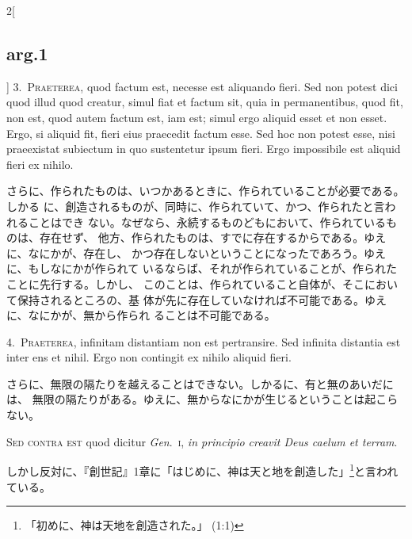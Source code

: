 \documentclass[paper=a4paper,fontsize=10pt,jafontsize=9pt,titlepage]{jlreq}
\begin{document}
\begin{paracol}{2}[\subsection{arg.1}]
3.~{\scshape Praeterea}, quod factum est, necesse est aliquando fieri. Sed non potest
 dici quod illud quod creatur, simul fiat et factum sit, quia in
 permanentibus, quod fit, non est, quod autem factum est, iam est; simul
 ergo aliquid esset et non esset. Ergo, si aliquid fit, fieri eius
 praecedit factum esse. Sed hoc non potest esse, nisi praeexistat
 subiectum in quo sustentetur ipsum fieri. Ergo impossibile est aliquid
 fieri ex nihilo.

\switchcolumn

さらに、作られたものは、いつかあるときに、作られていることが必要である。しかる
 に、創造されるものが、同時に、作られていて、かつ、作られたと言われることはでき
 ない。なぜなら、永続するものどもにおいて、作られているものは、存在せず、
他方、作られたものは、すでに存在するからである。ゆえに、なにかが、存在し、
 かつ存在しないということになったであろう。ゆえに、もしなにかが作られて
 いるならば、それが作られていることが、作られたことに先行する。しかし、
 このことは、作られていること自体が、そこにおいて保持されるところの、基
 体が先に存在していなければ不可能である。ゆえに、なにかが、無から作られ
 ることは不可能である。


4.~{\scshape Praeterea}, infinitam distantiam non est pertransire. Sed infinita
 distantia est inter ens et nihil. Ergo non contingit ex nihilo aliquid
 fieri.

\switchcolumn

さらに、無限の隔たりを越えることはできない。しかるに、有と無のあいだには、
 無限の隔たりがある。ゆえに、無からなにかが生じるということは起こらない。

\switchcolumn*[\subsection{s.c.}]

{\scshape Sed contra est} quod dicitur {\itshape Gen}.~{\scshape i}, {\itshape in principio creavit Deus caelum et
 terram}.

\switchcolumn

しかし反対に、『創世記』1章に「はじめに、神は天と地を創造した」\footnote
{「初めに、神は天地を創造された。」 (1:1)
}と言われ
 ている。



\end{paracol}
\end{document}
